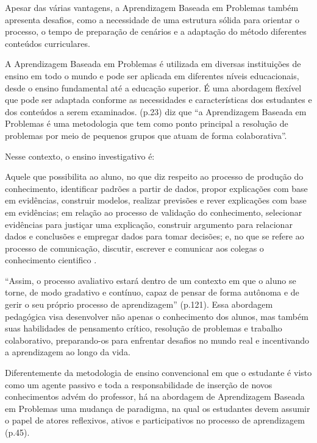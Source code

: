 Apesar das várias vantagens, a Aprendizagem Baseada em Problemas também apresenta desafios, como a necessidade de uma estrutura sólida para orientar o processo, o tempo de preparação de cenários e a adaptação do método diferentes conteúdos curriculares.

A Aprendizagem Baseada em Problemas é utilizada em diversas instituições de ensino em todo o mundo e pode ser aplicada em diferentes níveis educacionais, desde o ensino fundamental até a educação superior. É uma abordagem flexível que pode ser adaptada conforme as necessidades e características dos estudantes e dos conteúdos a serem examinados.  (p.23) diz que ``a Aprendizagem Baseada em Problemas é uma metodologia que tem como ponto principal a resolução de problemas por meio de pequenos grupos que atuam de forma colaborativa''.

Nesse contexto, o ensino investigativo é:

\begin{citacao}
    Aquele que possibilita ao aluno, no que diz respeito ao processo de produção do conhecimento, identificar padrões a partir de dados, propor explicações com base em evidências, construir modelos, realizar previsões e rever explicações com base em evidências; em relação ao processo de validação do conhecimento, selecionar evidências para justiçar uma explicação, construir argumento para relacionar dados e conclusões e empregar dados para tomar decisões; e, no que se refere ao processo de comunicação, discutir, escrever e comunicar aos colegas o conhecimento cientifico \cite{SCARPA-SILVA2013}.
\end{citacao}

``Assim, o processo avaliativo estará dentro de um contexto em que o aluno se torne, de modo gradativo e contínuo, capaz de pensar de forma autônoma e de gerir o seu próprio processo de aprendizagem'' \cite{CAMARGO2019} (p.121). Essa abordagem pedagógica visa desenvolver não apenas o conhecimento dos alunos, mas também suas habilidades de pensamento crítico, resolução de problemas e trabalho colaborativo, preparando-os para enfrentar desafios no mundo real e incentivando a aprendizagem ao longo da vida.

\begin{citacao}
    Diferentemente da metodologia de ensino convencional em que o estudante é visto como um agente passivo e toda a responsabilidade de inserção de novos conhecimentos advém do professor, há na abordagem de Aprendizagem Baseada em Problemas uma mudança de paradigma, na qual os estudantes devem assumir o papel de atores reflexivos, ativos e participativos no processo de aprendizagem \cite{NUNES2022} (p.45).
\end{citacao}

